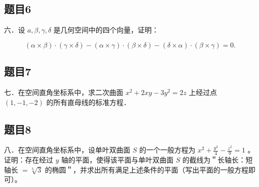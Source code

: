 \documentclass{article}
\begin{document}
\subsection{题目6}
六．设 \(a, \beta, \gamma, \delta\) 是几何空间中的四个向量，证明：

\[
(\alpha \times \beta) \cdot(\gamma \times \delta)-(\alpha \times \gamma) \cdot(\beta \times \delta)-(\delta \times \alpha) \cdot(\beta \times \gamma)=0 .
\]

\subsection{题目7}
七．在空间直角坐标系中，求二次曲面 \(x^{2}+2 x y-3 y^{2}=2 z\) 上经过点 \((1,-1,-2)\) 的所有直母线的标准方程．

\subsection{题目8}
八．在空间直角坐标系中，设单叶双曲面 \(S\) 的一个一般方程为 \(x^{2}+\frac{y^{2}}{4}-\frac{z^{2}}{9}=1\) 。证明：存在经过 \(y\) 轴的平面，使得该平面与单叶双曲面 \(S\) 的截线为＂长轴长：短轴长 \(=\sqrt[3]{3}\) 的椭圆＂，并求出所有满足上述条件的平面（写出平面的一般方程即可）。
\end{document}
